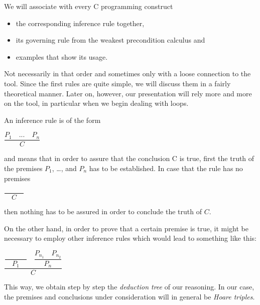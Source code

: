 \documentclass[middle]{zmdocument}
\begin{document}
We will associate with every C programming construct

\begin{itemize}
\item the corresponding inference rule together,
\item its governing rule from the weakest precondition calculus and
\item examples that show its usage.
\end{itemize}

Not necessarily in that order and sometimes only with a loose connection
to the tool. Since the first rules are quite simple, we will discuss
them in a fairly theoretical manner. Later on, however, our presentation
will rely more and more on the tool, in particular when we begin dealing
with loops.





An inference rule is of the form




\begin{center}
$\dfrac{P_1 \quad ... \quad P_n}{C}$


\end{center}


and means that in order to assure that the conclusion C is true, first
the truth of the premises $P_1$, \ldots{}, and $P_n$ has to be
established. In case that the rule has no premises




\begin{center}
$\dfrac{}{\quad C \quad}$


\end{center}


then nothing has to be assured in order to conclude the truth of $C$.

On the other hand, in order to prove that a certain premise is true, it
might be necessary to employ other inference rules which would lead to
something like this:




\begin{center}
$\dfrac{\dfrac{}{\quad P_1\quad} \quad \dfrac{P_{n_1}\quad P_{n_2}}{P_n}}{C}$


\end{center}


This way, we obtain step by step the \emph{deduction tree} of our
reasoning. In our case, the premises and conclusions under consideration
will in general be \emph{Hoare triples}.
\end{document}
